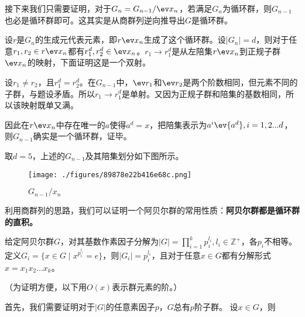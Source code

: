 接下来我们只需要证明，对于$G_{n}=G_{n-1}/\ev x_n$，若满足$G_{n}$为循环群，则$G_{n-1}$也必是循环群即可。这其实是从商群列逆向推导出$G$是循环群。

设$r$是$G_n$的生成元代表元素，即$r\ev x_n$生成了这个循环群。设$|G_{n}|=d$，则对于任意$r_1,r_2\in r\ev x_n$都有$r_1^d,r_2^d\in\ev x_n$。$r_1\rightarrow r_1^d$是从左陪集$r\ev x_n$到正规子群$\ev x_n$的映射，下面证明这是一个双射。

设$r_1\neq r_2$，且$r_1^d=r_2^d$。在$G_{n-1}$中，$\ev r_1$和$\ev r_2$是两个阶数相同，但元素不同的子群，与题设矛盾。所以$r_1\rightarrow r_1^d$是单射。又因为正规子群和陪集的基数相同，所以该映射既单又满。

因此在$r\ev x_n$中存在唯一的$a$使得$a^d=x$，把陪集表示为$a^i\ev {a^d},i=1,2...d$，则$G_{n-1}$确实是一个循环群，证毕。

取$d=5$，上述的$G_{n-1}$及其陪集划分如下图所示。
\begin{figure}[ht]
\centering
\texttt{[image: ./figures/89878e22b416e68c.png]}
\caption{$G_{n-1}/x_n$} \label{fig_cyclic_2}
\end{figure}
利用商群列的思路，我们可以证明一个阿贝尔群的常用性质：\textbf{阿贝尔群都是循环群的直积。
}
\begin{theorem}{}
给定阿贝尔群$G$，对其基数作素因子分解为$|G|=\prod_{i=1}^{k} p_{i}^{l_{i}},l_i\in\mathbb{Z}^+$，各$p_i$不相等。
定义$G_i = \{x \in G \mid x^{p_i^{l_i}} = e\}$，则$|G_i|=p_i^{l_i}$，且对于任意$x\in G$都有分解形式$x=x_1x_2...x_k$。
\end{theorem}
（为证明方便，以下用$O(x)$表示群元素的阶。）

首先，我们需要证明对于$|G|$的任意素因子$p$，$G$总有$p$阶子群。
设$x\in G$，则$$